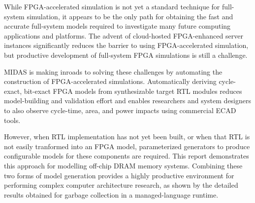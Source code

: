 While FPGA-accelerated simulation is not yet a standard technique for
full-system simulation, it appears to be the only path for obtaining the fast
and accurate full-system models required to investigate many future computing
applications and platforms. The advent of cloud-hosted FPGA-enhanced server
instances significantly reduces the barrier to using FPGA-accelerated
simulation, but productive development of full-system FPGA simulations is still
a challenge.

MIDAS is making inroads to solving these challenges by automating the
construction of FPGA-accelerated simulations. Automatically deriving
cycle-exact, bit-exact FPGA models from synthesizable target RTL modules
reduces model-building and validation effort and enables researchers and system
designers to also observe cycle-time, area, and power impacts using commercial
ECAD tools.

However, when RTL implementation has not yet been built, or when that RTL is
not easily tranformed into an FPGA model, parameterized generators to produce
configurable models for these components are required. This report demonstrates
this approach for modelling off-chip DRAM memory systems. Combining these two forms
of model generation provides a highly productive environment for performing
complex computer architecture research, as shown by the detailed results
obtained for garbage collection in a managed-language runtime.
